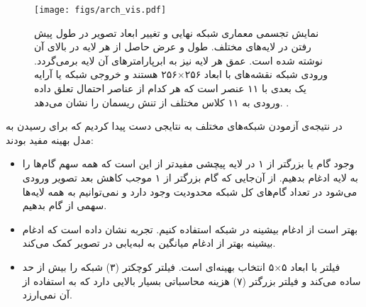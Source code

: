 \begin{figure}
	\begin{center}
		\texttt{[image: figs/arch\_vis.pdf]}
	\end{center}
	\caption[
			نمایش تجسمی معماری شبکه نهایی و تغییر ابعاد تصویر در طول پیش رفتن در لایه‌های مختلف. طول و عرض حاصل از هر لایه در بالای آن نوشته شده است. عمق هر لایه نیز به ابرپارامترهای آن لایه برمی‌گردد. ورودی شبکه نقشه‌های با ابعاد 
	۲۵۶$\times$۲۵۶
	هستند و خروجی شبکه یا آرایه یک بعدی با ۱۱ عنصر است که هر کدام از عناصر احتمال تعلق داده ورودی به ۱۱ کلاس مختلف از تنش ریسمان را نشان می‌دهد.  
	]{
		نمایش تجسمی معماری شبکه نهایی و تغییر ابعاد تصویر در طول پیش رفتن در لایه‌های مختلف. طول و عرض حاصل از هر لایه در بالای آن نوشته شده است. عمق هر لایه نیز به ابرپارامترهای آن لایه برمی‌گردد. ورودی شبکه نقشه‌های با ابعاد 
		۲۵۶$\times$۲۵۶
		هستند و خروجی شبکه یا آرایه یک بعدی با ۱۱ عنصر است که هر کدام از عناصر احتمال تعلق داده ورودی به ۱۱ کلاس مختلف از تنش ریسمان را نشان می‌دهد.    
		\footnotemark.}
	\label{fig:arch_vis}
\end{figure} 
در نتیجه‌ی آزمودن شبکه‌های مختلف به نتایجی دست پیدا کردیم که برای رسیدن به مدل بهینه مفید بودند:
\begin{itemize}
	\item 
	وجود گام یا 
	بزرگتر از ۱ در لایه پیچشی مفیدتر از این است که همه سهم گام‌ها را به لایه ادغام بدهیم. از آن‌جایی که گام بزرگتر از ۱ موجب کاهش بعد تصویر ورودی می‌شود در تعداد گام‌های کل شبکه محدودیت وجود دارد و نمی‌توانیم به همه لایه‌ها سهمی از گام بدهیم.   
	\item
	بهتر است از ادغام بیشینه در شبکه استفاده کنیم. تجربه نشان داده است که ادغام بیشینه بهتر از ادغام میانگین به لبه‌یابی در تصویر کمک می‌کند. 
	\item
	 فیلتر با ابعاد ۵$\times$۵ انتخاب بهینه‌ای است. فیلتر کوچکتر (۳) شبکه را بیش از حد ساده می‌کند و فیلتر بزرگتر (۷) هزینه محاسباتی بسیار بالایی دارد که به استفاده از آن نمی‌ارزد. 
\end{itemize}

